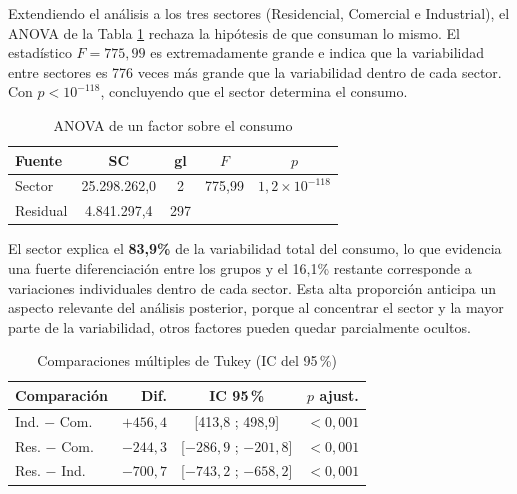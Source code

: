         Extendiendo el análisis a los tres sectores (Residencial, Comercial e
        Industrial), el ANOVA de la Tabla \ref{anova_tabla} rechaza la hipótesis
        de que consuman lo mismo. El estadístico $F=775,99$ es extremadamente
        grande e indica que la variabilidad entre sectores es 776 veces más 
        grande que la variabilidad dentro de cada sector. Con
        $p < 10^{-118}$, concluyendo que el sector determina el consumo.

        \begin{table}[H]
            \centering
            \caption{ANOVA de un factor sobre el consumo}
            \begin{center}
                \begin{tabular}{|l|c|c|c|c|}
                    \hline
                    \textbf{Fuente} & \textbf{SC} & \textbf{gl} & \textbf{$F$} &
                    \textbf{$p$} \\
                    \hline
                    Sector   & 25.298.262,0 & 2   & 775,99 &
                    $1{,}2\times10^{-118}$ \\
                    \hline
                    Residual & 4.841.297,4  & 297 & & \\
                    \hline
                \end{tabular}
                \label{anova_tabla}
            \end{center}
        \end{table}

        El sector explica el \textbf{83,9\%} de la variabilidad total del
        consumo, lo que evidencia una fuerte diferenciación entre los grupos 
        y el 16,1\% restante corresponde a variaciones individuales dentro de 
        cada sector. Esta alta proporción anticipa un aspecto relevante del 
        análisis posterior, porque al concentrar el sector y la mayor parte de 
        la variabilidad, otros factores pueden quedar parcialmente ocultos.

        \begin{table}[H]
            \centering
            \caption{Comparaciones múltiples de Tukey (IC del 95\,\%)}
            \begin{center}
                \begin{tabular}{|l|r|c|c|}
                    \hline
                    \textbf{Comparación} & \textbf{Dif.} & \textbf{IC 95\,\%}
                    & \textbf{$p$ ajust.} \\
                    \hline
                    Ind. $-$ Com. & $+456{,}4$ & [413,8 ; 498,9] &
                    $<0{,}001$ \\
                    \hline
                    Res. $-$ Com. & $-244{,}3$ & [$-286{,}9$ ; $-201{,}8$] &
                    $<0{,}001$ \\
                    \hline
                    Res. $-$ Ind. & $-700{,}7$ & [$-743{,}2$ ; $-658{,}2$] &
                    $<0{,}001$ \\
                    \hline
                \end{tabular}
                \label{tukey_tabla}
            \end{center}
        \end{table}

